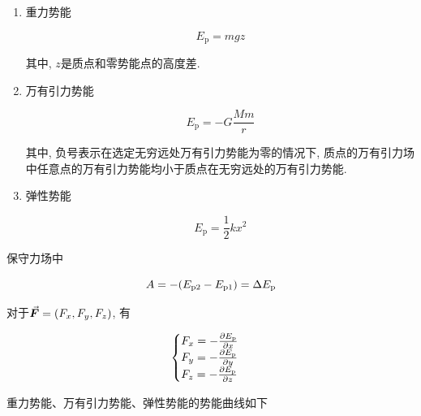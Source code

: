 \begin{enumerate}
	
	\item 重力势能
	
	\begin{equation}
		E_{\mathrm{p}} = mgz \label{C3-eq16}
	\end{equation}
	
	其中, $z$是质点和零势能点的高度差. 
	
	\item 万有引力势能
	
	\begin{equation}
		E_{\mathrm{p}} = - G \dfrac{Mm}{r} \label{C3-eq17}
	\end{equation}
	
	其中, 负号表示在选定无穷远处万有引力势能为零的情况下, 质点的万有引力场中任意点的万有引力势能均小于质点在无穷远处的万有引力势能. 
	
	\item 弹性势能
	
	\begin{equation}
		E_{\mathrm{p}} = \dfrac{1}{2} k x^2 \label{C3-eq18}
	\end{equation}
	
\end{enumerate}

保守力场中

\begin{equation}
	A = - \qty(E_{\mathrm{p2}} - E_{\mathrm{p}1}) = \Delta E_{\mathrm{p}} \label{C3-eq19}
\end{equation}

对于$\va*{F} = \qty(F_x, F_y, F_z)$, 有

\begin{equation}
	\begin{cases}
		F_x = - \pdv{E_{\mathrm{p}}}{x} \\
		F_y = - \pdv{E_{\mathrm{p}}}{y} \\
		F_z = - \pdv{E_{\mathrm{p}}}{z}
	\end{cases}
    \label{C3-eq20}
\end{equation}

重力势能、万有引力势能、弹性势能的势能曲线如下

